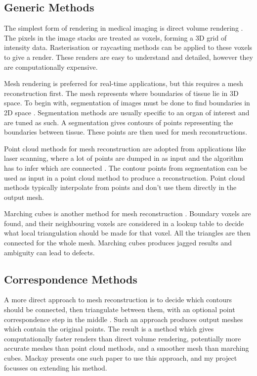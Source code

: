 \documentclass[10pt]{article}
\begin{document}
\subsection{Generic Methods}

The simplest form of rendering in medical imaging is direct volume rendering \cite{fishman2006volume}. The pixels in the image stacks are treated as voxels, forming a 3D grid of intensity data. Rasterisation or raycasting methods can be applied to these voxels to give a render. These renders are easy to understand and detailed, however they are computationally expensive.

Mesh rendering is preferred for real-time applications, but this requires a mesh reconstruction first. The mesh represents where boundaries of tissue lie in 3D space. To begin with, segmentation of images must be done to find boundaries in 2D space \cite{birkfellner2016applied}. Segmentation methods are usually specific to an organ of interest and are tuned as such. A segmentation gives contours of points representing the boundaries between tissue. These points are then used for mesh reconstructions.

Point cloud methods for mesh reconstruction are adopted from applications like laser scanning, where a lot of points are dumped in as input and the algorithm has to infer which are connected  \cite{oztireli2009feature}. The contour points from segmentation can be used as input in a point cloud method to produce a reconstruction. Point cloud methods typically interpolate from points and don't use them directly in the output mesh.

Marching cubes is another method for mesh reconstruction \cite{lorensen1987marching}. Boundary voxels are found, and their neighbouring voxels are considered in a lookup table to decide what local triangulation should be made for that voxel. All the triangles are then connected for the whole mesh. Marching cubes produces jagged results and ambiguity can lead to defects.

\subsection{Correspondence Methods}

A more direct approach to mesh reconstruction is to decide which contours should be connected, then triangulate between them, with an optional point correspondence step in the middle \cite{mukundan2016reconstruction}. Such an approach produces output meshes which contain the original points. The result is a method which gives computationally faster renders than direct volume rendering, potentially more accurate meshes than point cloud methods, and a smoother mesh than marching cubes. Mackay \cite{mackay2019robust} presents one such paper to use this approach, and my project focusses on extending his method.
\end{document}
